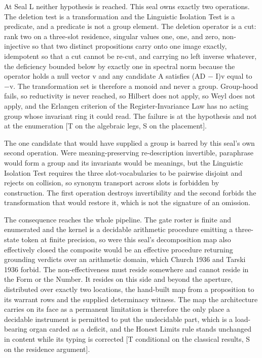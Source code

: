 \documentclass[10pt,twocolumn]{article}
\begin{document}
At Seal L neither hypothesis is reached. This seal owns exactly two
operations. The deletion test is a transformation and the Linguistic
Isolation Test is a predicate, and a predicate is not a group element.
The deletion operator is a cut: rank two on a three-slot residence,
singular values one, one, and zero, non-injective so that two distinct
propositions carry onto one image exactly, idempotent so that a cut
cannot be re-cut, and carrying no left inverse whatever, the deficiency
bounded below by exactly one in spectral norm because the operator holds
a null vector v and any candidate A satisfies (AD − I)v equal to −v. The
transformation set is therefore a monoid and never a group. Group-hood
fails, so reductivity is never reached, so Hilbert does not apply, so
Weyl does not apply, and the Erlangen criterion of the
Register-Invariance Law has no acting group whose invariant ring it
could read. The failure is at the hypothesis and not at the enumeration
{[}T on the algebraic legs, S on the placement{]}.

The one candidate that would have supplied a group is barred by this
seal's own second operation. Were meaning-preserving re-description
invertible, paraphrase would form a group and its invariants would be
meanings, but the Linguistic Isolation Test requires the three
slot-vocabularies to be pairwise disjoint and rejects on collision, so
synonym transport across slots is forbidden by construction. The first
operation destroys invertibility and the second forbids the
transformation that would restore it, which is not the signature of an
omission.

The consequence reaches the whole pipeline. The gate roster is finite
and enumerated and the kernel is a decidable arithmetic procedure
emitting a three-state token at finite precision, so were this seal's
decomposition map also effectively closed the composite would be an
effective procedure returning grounding verdicts over an arithmetic
domain, which Church 1936 and Tarski 1936 forbid. The non-effectiveness
must reside somewhere and cannot reside in the Form or the Number. It
resides on this side and beyond the aperture, distributed over exactly
two locations, the hand-built map from a proposition to its warrant rows
and the supplied determinacy witness. The map the architecture carries
on its face as a permanent limitation is therefore the only place a
decidable instrument is permitted to put the undecidable part, which is
a load-bearing organ carded as a deficit, and the Honest Limits rule
stands unchanged in content while its typing is corrected {[}T
conditional on the classical results, S on the residence argument{]}.
\end{document}
